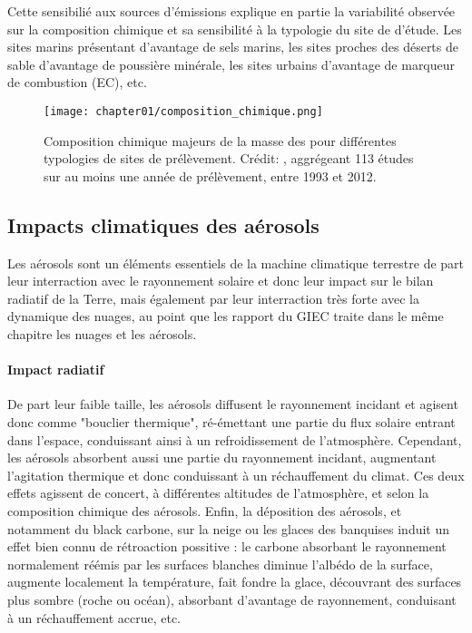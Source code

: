 Cette sensibilié aux sources d'émissions explique en partie la variabilité observée sur la
composition chimique et sa sensibilité à la typologie du site de d'étude. Les sites marins
présentant d'avantage de sels marins, les sites proches des déserts de sable d'avantage de
poussière minérale, les sites urbains d'avantage de marqueur de combustion (EC), etc.

\begin{figure}[htpb]
    \centering
    \texttt{[image: chapter01/composition\_chimique.png]}
    \caption{Composition chimique majeurs de la masse des \PMdix{} pour différentes
        typologies de sites de prélèvement. Crédit: \cite[figure 7.13]{boucherClouds2013},
        aggrégeant 113 études sur au moins une année de prélèvement, entre 1993 et 2012.}%
    \label{fig:chapter01/composition_chimique}
\end{figure}

\subsection{Impacts climatiques des aérosols}%
\label{sub:impacts_climatiques_des_aerosols}

Les aérosols sont un éléments essentiels de la machine climatique terrestre de part leur
interraction avec le rayonnement solaire et donc leur impact sur le bilan radiatif de la
Terre, mais également par leur interraction très forte avec la dynamique des nuages, au
point que les rapport du GIEC traite dans le même chapitre les nuages et les aérosols.

\paragraph{Impact radiatif}%
\label{par:impact_radiatif}

De part leur faible taille, les aérosols diffusent le rayonnement incidant et agisent donc
comme "bouclier thermique", ré-émettant une partie du flux solaire entrant dans l'espace,
conduissant ainsi à un refroidissement de l'atmosphère.
Cependant, les aérosols absorbent aussi une partie du rayonnement incidant, augmentant
l'agitation thermique et donc conduissant à un réchauffement du climat.
Ces deux effets agissent de concert, à différentes altitudes de l'atmosphère, et selon la
composition chimique des aérosols.
Enfin, la déposition des aérosols, et notamment du black carbone, sur la neige ou les
glaces des banquises induit un effet bien connu de rétroaction possitive : le carbone
absorbant le rayonnement normalement réémis par les surfaces blanches diminue l'albédo de
la surface, augmente localement la température, fait fondre la glace, découvrant des
surfaces plus sombre (roche ou océan), absorbant d'avantage de rayonnement, conduisant à
un réchauffement accrue, etc.

